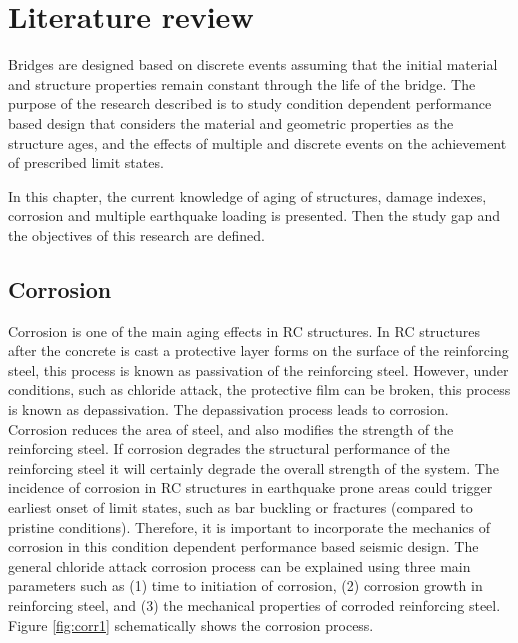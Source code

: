 \chapter{Literature review}
\label{chap-two}
Bridges are designed based on discrete events assuming that the initial material and structure properties remain constant through the life of the bridge. The purpose of the research described is to study condition dependent performance based design that considers the material and geometric properties as the structure ages, and the effects of multiple and discrete events on the achievement of prescribed limit states.

In this chapter, the current knowledge of aging of structures, damage indexes, corrosion and multiple earthquake loading is presented. Then the study gap and the objectives of this research are defined.

\section{Corrosion}

Corrosion is one of the main aging effects in RC structures. In RC structures after the concrete is cast a protective layer forms on the surface of the reinforcing steel, this process is known as passivation of the reinforcing steel. However, under conditions, such as chloride attack, the protective film can be broken, this process is known as depassivation. The depassivation process leads to corrosion. Corrosion reduces the area of steel, and also modifies the strength of the reinforcing steel. If corrosion degrades the structural performance of the reinforcing steel it will certainly degrade the overall strength of the system. The incidence of corrosion in RC structures in earthquake prone areas could trigger earliest onset of limit states, such as bar buckling or fractures (compared to pristine conditions). Therefore, it is important to incorporate the  mechanics of corrosion in this condition dependent performance based seismic design. The general chloride attack corrosion process can be explained using three main parameters such as (1) time to initiation of corrosion, (2) corrosion growth in reinforcing steel, and (3) the mechanical properties of corroded reinforcing steel. Figure \ref{fig:corr1} schematically shows the corrosion process.

